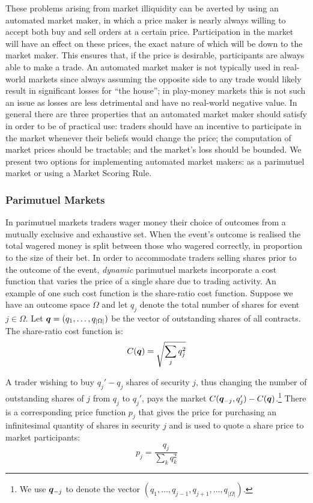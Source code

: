 These problems arising from market illiquidity can be averted by using an
automated market maker, in which a price maker is nearly always willing to
accept both buy and sell orders at a certain price. Participation in the market
will have an effect on these prices, the exact nature of which will be down to
the market maker. This ensures that, if the price is desirable, participants
are always able to make a trade. An automated market maker is not typically
used in real-world markets since always assuming the opposite side to any trade
would likely result in significant losses for ``the house''; in play-money
markets this is not such an issue as losses are less detrimental and have no
real-world negative value. In general there are three properties that an
automated market maker should satisfy in order to be of practical use: traders
should have an incentive to participate in the market whenever their beliefs
would change the price; the computation of market prices should be tractable;
and the market's loss should be bounded. We present two options for
implementing automated market makers: as a parimutuel market or using a Market
Scoring Rule.

\subsubsection{Parimutuel Markets}

In parimutuel markets traders wager money their choice of outcomes from a
mutually exclusive and exhaustive set. When the event's outcome is realised the
total wagered money is split between those who wagered correctly, in proportion
to the size of their bet. In order to accommodate traders selling shares prior
to the outcome of the event, \emph{dynamic} parimutuel markets incorporate a
cost function that varies the price of a single share due to trading activity.
An example of one such cost function is the share-ratio cost function. Suppose
we have an outcome space $\Omega$ and let $q_j$ denote the total number of
shares for event $j \in \Omega$. Let $\bm{q} = (q_1, \ldots, q_{|\Omega|})$
be the vector of outstanding shares of all contracts. The share-ratio cost
function is:
%
$$ C(\bm{q}) = \sqrt{\sum_j q_j^2} $$

A trader wishing to buy $q_j' - q_j$ shares of security $j$, thus changing the
number of outstanding shares of $j$ from $q_j$ to $q_j'$, pays the market
$C(\bm{q}_{-j}, q_j') - C(\bm{q})$.\footnote{We use $\bm{q}_{-j}$ to
denote the vector $(q_1, \ldots, q_{j-1}, q_{j+1}, \ldots, q_{|\Omega|})$.}
There is a corresponding price function $p_j$ that gives the price for
purchasing an infinitesimal quantity of shares in security $j$ and is used to
quote a share price to market participants:
%
$$ p_j = \frac{q_j}{\sum_k q_k^2} $$

